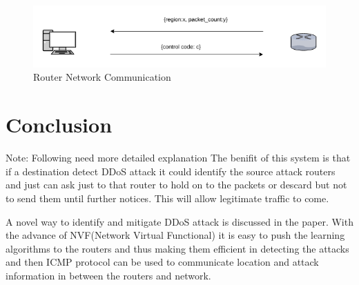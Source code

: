 \documentclass[10pt,oneside,a4paper]{article}
\begin{document}
\begin{figure}[H]
\centering
\includegraphics[scale=0.5]{router-network-communication}
\caption{Router Network Communication} \label{fig:router-network-communication}
\end{figure}


\section{Conclusion}

{Note: Following need more detailed explanation}
The benifit of this system is that if a destination detect DDoS attack it could identify the source attack routers and just can ask just to that router to hold on to the packets or descard but not to send them until further notices. This will allow legitimate traffic to come.

A novel way to identify and mitigate DDoS attack is discussed in the paper. With the advance of NVF(Network Virtual Functional) it is easy to push the learning algorithms to the routers and thus making them efficient in detecting the attacks and then ICMP protocol can be used to communicate location and attack information in between the routers and network.

\end{document}
